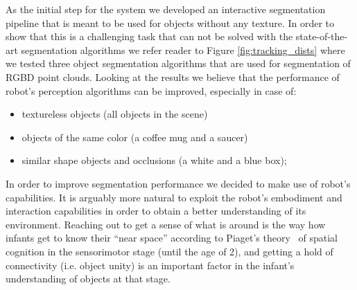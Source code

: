 As the initial step for the system we developed an interactive segmentation pipeline that is meant to be used for objects without any texture. In order to show that this is a challenging task that can not be solved with the state-of-the-art segmentation algorithms we refer reader to Figure \ref{fig:tracking_dists} where we tested three object segmentation algorithms that are used for segmentation of RGBD point clouds. Looking at the results we believe that the performance of robot's perception algorithms can be improved, especially in case of: 

\begin{itemize} 
\item textureless objects (all objects in the scene)
\item objects of the same color (a coffee mug and a saucer)
\item similar shape objects and occlusions (a white and a blue box);
\end{itemize}


In order to improve segmentation performance we decided to make use of robot's
capabilities. It is arguably more natural to exploit the robot's embodiment
and interaction capabilities in order to obtain a better understanding of its environment.
Reaching out to get a sense of what is around is the way how infants get to know their
``near space'' according to Piaget's theory~\cite{infants} of spatial cognition in the sensorimotor stage 
(until the age of 2), and getting a hold of connectivity (i.e. object unity) is an important
factor in the infant's understanding of objects at that stage.

